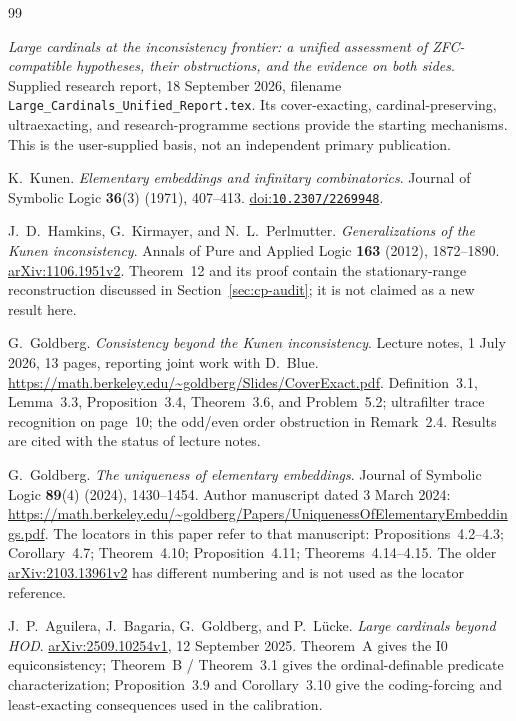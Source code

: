 \documentclass[11pt,letterpaper]{article}
\theoremstyle{definition}
\newcommand{\Izero}{\mathrm{I0}}
\newcommand{\arxiv}[1]{\href{https://arxiv.org/abs/#1}{arXiv:#1}}
\newcommand{\doi}[1]{\href{https://doi.org/#1}{doi:\nolinkurl{#1}}}
\begin{document}
\Needspace{120pt}
{}
\begin{thebibliography}{99}
\small
\setlength{\itemsep}{6pt}
\setlength{\parskip}{1pt}

\emph{Large cardinals at the inconsistency frontier: a unified assessment of ZFC-compatible hypotheses, their obstructions, and the evidence on both sides}.
Supplied research report, 18 September 2026, filename
\nolinkurl{Large_Cardinals_Unified_Report.tex}.
Its cover-exacting, cardinal-preserving, ultraexacting, and research-programme sections provide the starting mechanisms. This is the user-supplied basis, not an independent primary publication.

K.~Kunen. \emph{Elementary embeddings and infinitary combinatorics}.
Journal of Symbolic Logic \textbf{36}(3) (1971), 407--413.
\doi{10.2307/2269948}.

J.~D.~Hamkins, G.~Kirmayer, and N.~L.~Perlmutter.
\emph{Generalizations of the Kunen inconsistency}.
Annals of Pure and Applied Logic \textbf{163} (2012), 1872--1890.
\arxiv{1106.1951v2}.
Theorem~12 and its proof contain the stationary-range reconstruction discussed in Section~\ref{sec:cp-audit}; it is not claimed as a new result here.

G.~Goldberg. \emph{Consistency beyond the Kunen inconsistency}.
Lecture notes, 1 July 2026, 13 pages, reporting joint work with D.~Blue.
\url{https://math.berkeley.edu/~goldberg/Slides/CoverExact.pdf}.
Definition~3.1, Lemma~3.3, Proposition~3.4, Theorem~3.6, and Problem~5.2; ultrafilter trace recognition on page~10; the odd/even order obstruction in Remark~2.4. Results are cited with the status of lecture notes.

G.~Goldberg. \emph{The uniqueness of elementary embeddings}.
Journal of Symbolic Logic \textbf{89}(4) (2024), 1430--1454.
Author manuscript dated 3 March 2024:
\url{https://math.berkeley.edu/~goldberg/Papers/UniquenessOfElementaryEmbeddings.pdf}.
The locators in this paper refer to that manuscript: Propositions~4.2--4.3; Corollary~4.7; Theorem~4.10; Proposition~4.11; Theorems~4.14--4.15. The older \arxiv{2103.13961v2} has different numbering and is not used as the locator reference.

J.~P.~Aguilera, J.~Bagaria, G.~Goldberg, and P.~L\"ucke.
\emph{Large cardinals beyond HOD}.
\arxiv{2509.10254v1}, 12 September 2025.
Theorem~A gives the $\Izero$ equiconsistency; Theorem~B / Theorem~3.1 gives the ordinal-definable predicate characterization; Proposition~3.9 and Corollary~3.10 give the coding-forcing and least-exacting consequences used in the calibration.


\end{thebibliography}
\end{document}
